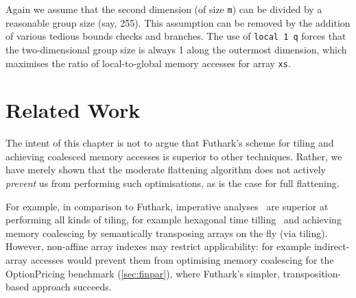 Again we assume that the second dimension (of size \texttt{m}) can be
divided by a reasonable group size (say, 255).  This assumption can be
removed by the addition of various tedious bounds checks and branches.
The use of \lstinline{local 1 q} forces that the two-dimensional group
size is always 1 along the outermost dimension, which maximises the
ratio of local-to-global memory accesses for array \lstinline{xs}.

\section{Related Work}

The intent of this chapter is not to argue that Futhark's scheme for
tiling and achieving coalesced memory accesses is superior to other
techniques.  Rather, we have merely shown that the moderate flattening
algorithm does not actively \textit{prevent} us from performing such
optimisations, as is the case for full flattening.

For example, in comparison to Futhark, imperative
analyses~\cite{InformalTiling,PolyPluto2} are superior at performing
all kinds of tiling, for example hexagonal time
tilling~\cite{HexaTiling} and achieving memory coalescing by
semantically transposing arrays on the fly (via tiling).
%
However, non-affine array indexes may restrict applicability: for
example indirect-array accesses would prevent them from optimising
memory coalescing for the OptionPricing benchmark (\cref{sec:finpar}),
where Futhark's simpler, transposition-based approach succeeds.

